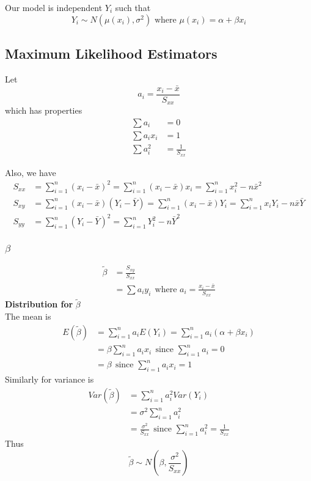 \documentclass[12pt, leqno]{article}
\theoremstyle{definition}
\begin{document}
  Our model is independent $Y_{i}$ such that
  $$Y_{i} \sim N(\mu(x_{i}), \sigma^{2}) \text{ where } \mu(x_{i}) = \alpha + \beta x_{i}$$

  \subsection{Maximum Likelihood Estimators}
  Let
  $$a_{i} = \frac{x_{i} - \bar{x}}{S_{xx}}$$
  which has properties
  \begin{align*}
  \sum a_{i} &= 0 \\
  \sum a_{i}x_{i} &= 1 \\
  \sum a_{i}^{2} &= \frac{1}{S_{xx}}
  \end{align*}

  Also, we have
  \begin{align*}
  S_{xx} &= \sum_{i=1}^{n}(x_{i} - \bar{x})^{2}
  = \sum_{i=1}^{n}(x_{i} - \bar{x})x_{i}
  = \sum_{i=1}^{n}x_{i}^{2} - n\bar{x}^{2} \\
  S_{xy} &= \sum_{i=1}^{n}(x_{i} - \bar{x})(Y_{i} - \bar{Y})
  = \sum_{i=1}^{n}(x_{i} - \bar{x})Y_{i}
  = \sum_{i=1}^{n}x_{i}Y_{i} - n\bar{x}\bar{Y} \\
  S_{yy} &= \sum_{i=1}^{n}(Y_{i} - \bar{Y})^{2}
  = \sum_{i=1}^{n}Y_{i}^{2} - n\bar{Y}^{2}
  \end{align*}

  \subsubsection{$\beta$}
  \begin{align*}
  \widetilde{\beta} &= \frac{S_{xy}}{S_{xx}} \\
  &= \sum a_{i}y_{i}  ~~\text{where } a_{i} = \frac{x_{i} - \bar{x}}{S_{xx}}
  \end{align*}
  \textbf{Distribution for } $\widetilde{\beta}$ \\
  The mean is
  \begin{align*}
  E(\widetilde{\beta}) &= \sum_{i=1}^{n} a_{i}E(Y_{i}) = \sum_{i=1}^{n} a_{i}(\alpha + \beta x_{i}) \\
  &= \beta \sum_{i=1}^{n}a_{i}x_{i} ~~\text{since } \sum_{i=1}^{n} a_{i} = 0 \\
  &= \beta ~~\text{since } \sum_{i=1}^{n} a_{i}x_{i} = 1
  \end{align*}
  Similarly for variance is
  \begin{align*}
  Var(\widetilde{\beta}) &= \sum_{i=1}^{n} a_{i}^{2}Var(Y_{i}) \\
  &= \sigma^{2} \sum_{i=1}^{n} a_{i}^{2} \\
  &= \frac{\sigma^{2}}{S_{xx}} ~~\text{since } \sum_{i=1}^{n}a_{i}^{2} = \frac{1}{S_{xx}}
  \end{align*}
  Thus
  $$\widetilde{\beta} \sim N\left(\beta, \frac{\sigma^{2}}{S_{xx}}\right)$$
\end{document}
